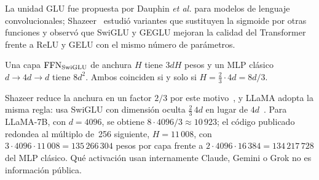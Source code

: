 La unidad GLU fue propuesta por Dauphin \emph{et al.} para modelos de lenguaje convolucionales; Shazeer~\cite[§2]{shazeer} estudió variantes que sustituyen la sigmoide por otras funciones y observó que SwiGLU y GEGLU mejoran la calidad del Transformer frente a ReLU y GELU con el mismo número de parámetros.

\addtocounter{definicion}{1}%

\begin{proposicion}\label{prop:anchura}
Una capa $\operatorname{FFN}_{\mathrm{SwiGLU}}$ de anchura $H$ tiene $3dH$ pesos y un MLP clásico $d\to 4d\to d$ tiene $8d^{2}$. Ambos coinciden si y solo si $H=\tfrac{2}{3}\cdot 4d=8d/3$.
\end{proposicion}

Shazeer reduce la anchura en un factor $2/3$ por este motivo~\cite[§2]{shazeer}, y LLaMA adopta la misma regla: usa SwiGLU con dimensión oculta $\tfrac23\,4d$ en lugar de $4d$~\cite[§2.2]{touvron}. Para LLaMA-7B, con $d=4096$, se obtiene $8\cdot 4096/3\approx 10\,923$; el código publicado redondea al múltiplo de~256 siguiente, $H=11\,008$, con $3\cdot 4096\cdot 11\,008=135\,266\,304$ pesos por capa frente a $2\cdot 4096\cdot 16\,384=134\,217\,728$ del MLP clásico. Qué activación usan internamente Claude, Gemini o Grok no es información pública.

